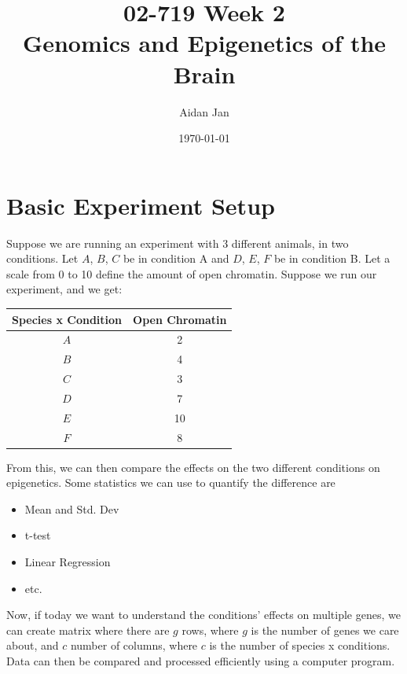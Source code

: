 \documentclass[10pt]{article}
\title{02-719 Week 2 \\ \large{Genomics and Epigenetics of the Brain}}
\author{Aidan Jan}
\date{\today}
\begin{document}
\maketitle

\section*{Basic Experiment Setup}
Suppose we are running an experiment with 3 different animals, in two conditions.  Let $A$, $B$, $C$ be in condition A and $D$, $E$, $F$ be in condition B.  Let a scale from 0 to 10 define the amount of open chromatin.  Suppose we run our experiment, and we get:
\begin{center}
\begin{tabular}{c|c}
Species x Condition & Open Chromatin \\ \hline
$A$ & 2 \\
$B$ & 4 \\
$C$ & 3 \\
$D$ & 7 \\
$E$ & 10 \\
$F$ & 8 \\
\end{tabular}
\end{center}
From this, we can then compare the effects on the two different conditions on epigenetics.  Some statistics we can use to quantify the difference are
\begin{itemize}
	\item Mean and Std. Dev
	\item t-test
	\item Linear Regression
	\item etc.
\end{itemize}
Now, if today we want to understand the conditions' effects on multiple genes, we can create matrix where there are $g$ rows, where $g$ is the number of genes we care about, and $c$ number of columns, where $c$ is the number of species x conditions.  Data can then be compared and processed efficiently using a computer program.
\end{document}
